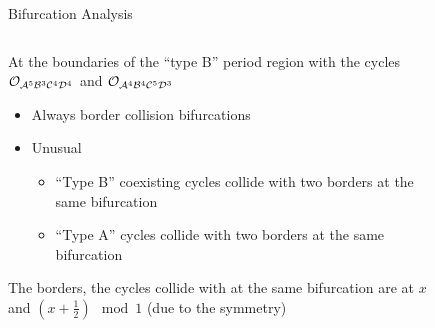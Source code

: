 \begin{frame}{Bifurcation Analysis}
	\vspace{-1em}
	\begin{columns}
		\begin{column}{.5 \textwidth}
			At the boundaries of the ``type B'' period region with the cycles $\mathcal{O}_{\mathcal{A}^5\mathcal{B}^3\mathcal{C}^4\mathcal{D}^4}$ and $\mathcal{O}_{\mathcal{A}^4\mathcal{B}^4\mathcal{C}^5\mathcal{D}^3}$
			\pause
			\begin{itemize}
				\item Always border collision bifurcations
				\item Unusual \begin{itemize}
					      \item ``Type B'' coexisting cycles collide with two borders at the same bifurcation
					      \item ``Type A'' cycles collide with two borders at the same bifurcation
				      \end{itemize}
			\end{itemize}
			\vspace{.5em}
			The borders, the cycles collide with at the same bifurcation are at $x$ and $(x + \frac{1}{2}) \mod 1$ (due to the symmetry)
		\end{column}
		\begin{column}{.5 \textwidth}
			\vspace{-5em}
			\begin{figure}
				\centering
\end{figure}
\end{column}
\end{columns}
\end{frame}
